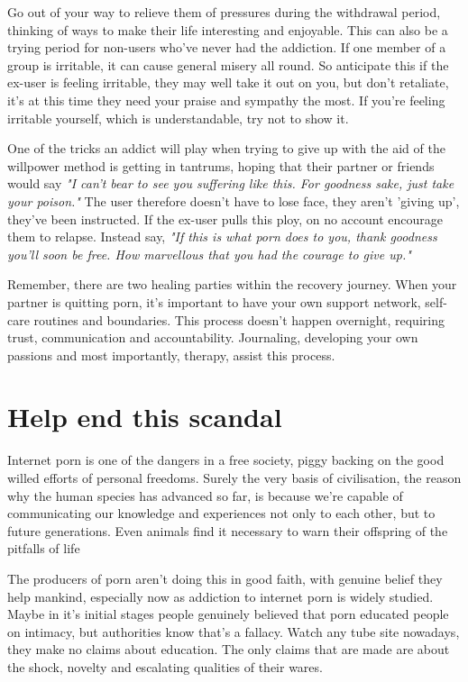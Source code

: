\documentclass[easypeasy.tex]{subfiles}
\begin{document}
Go out of your way to relieve them of pressures during the withdrawal period, thinking of ways to make their life interesting and enjoyable. This can also be a trying period for non-users who've never had the addiction. If one member of a group is irritable, it can cause general misery all round. So anticipate this if the ex-user is feeling irritable, they may well take it out on you, but don't retaliate, it's at this time they need your praise and sympathy the most. If you're feeling irritable yourself, which is understandable, try not to show it.

One of the tricks an addict will play when trying to give up with the aid of the willpower method is getting in tantrums, hoping that their partner or friends would say \textit{"I can't bear to see you suffering like this. For goodness sake, just take your poison."} The user therefore doesn't have to lose face, they aren't 'giving up', they've been instructed. If the ex-user pulls this ploy, on no account encourage them to relapse. Instead say, \textit{"If this is what porn does to you, thank goodness you'll soon be free. How marvellous that you had the courage to give up."}

Remember, there are two healing parties within the recovery journey. When your partner is quitting porn, it's important to have your own support network, self-care routines and boundaries. This process doesn't happen overnight, requiring trust, communication and accountability. Journaling, developing your own passions and most importantly, therapy, assist this process.

\section{Help end this scandal}

Internet porn is one of the dangers in a free society, piggy backing on the good willed efforts of personal freedoms. Surely the very basis of civilisation, the reason why the human species has advanced so far, is because we're capable of communicating our knowledge and experiences not only to each other, but to future generations. Even animals find it necessary to warn their offspring of the pitfalls of life

The producers of porn aren't doing this in good faith, with genuine belief they help mankind, especially now as addiction to internet porn is widely studied. Maybe in it's initial stages people genuinely believed that porn educated people on intimacy, but authorities know that's a fallacy. Watch any tube site nowadays, they make no claims about education. The only claims that are made are about the shock, novelty and escalating qualities of their wares.
\end{document}
